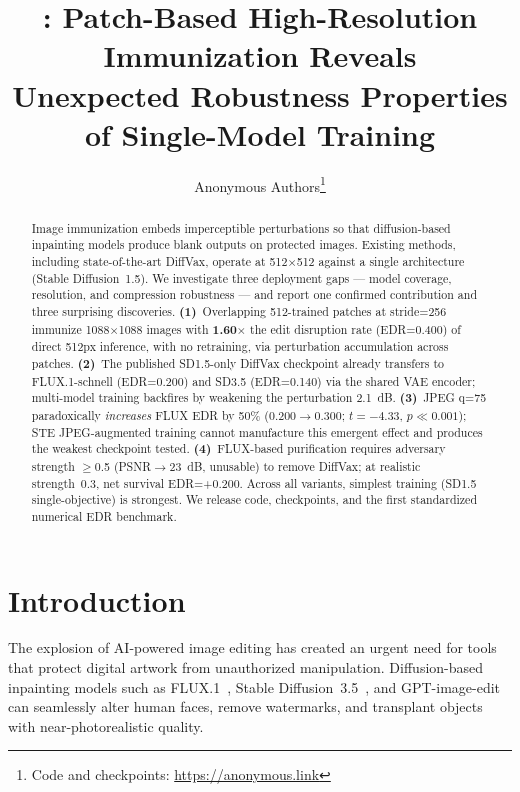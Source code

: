 \documentclass{article}
\title{\diffvaxpp: Patch-Based High-Resolution Immunization Reveals\\
Unexpected Robustness Properties of Single-Model Training}
\author{Anonymous Authors\thanks{Code and checkpoints: \url{https://anonymous.link}}}
\begin{document}
\maketitle

\begin{abstract}
Image immunization embeds imperceptible perturbations so that diffusion-based inpainting
models produce blank outputs on protected images.
Existing methods, including state-of-the-art DiffVax, operate at 512$\times$512 against
a single architecture (Stable Diffusion~1.5).
We investigate three deployment gaps --- model coverage, resolution, and compression
robustness --- and report one confirmed contribution and three surprising discoveries.
\textbf{(1)}~Overlapping 512-trained patches at stride=256 immunize 1088$\times$1088 images
with \textbf{1.60$\times$} the edit disruption rate (EDR=0.400) of direct 512px inference,
with no retraining, via perturbation accumulation across patches.
\textbf{(2)}~The published SD1.5-only DiffVax checkpoint already transfers to
FLUX.1-schnell (EDR=0.200) and SD3.5 (EDR=0.140) via the shared VAE encoder;
multi-model training backfires by weakening the perturbation 2.1~dB.
\textbf{(3)}~JPEG q=75 paradoxically \emph{increases} FLUX EDR by 50\%
(0.200$\to$0.300; $t=-4.33$, $p\ll0.001$); STE JPEG-augmented training
cannot manufacture this emergent effect and produces the weakest checkpoint tested.
\textbf{(4)}~FLUX-based purification requires adversary strength $\geq$0.5 (PSNR$\to$23~dB,
unusable) to remove DiffVax; at realistic strength~0.3, net survival EDR=+0.200.
Across all variants, simplest training (SD1.5 single-objective) is strongest.
We release code, checkpoints, and the first standardized numerical EDR benchmark.
\end{abstract}

\section{Introduction}

The explosion of AI-powered image editing has created an urgent need for tools that
protect digital artwork from unauthorized manipulation. Diffusion-based inpainting
models such as FLUX.1~\citep{flux2024}, Stable Diffusion~3.5~\citep{sd35_2024},
and GPT-image-edit~\citep{openai2024dalle3} can seamlessly alter human faces,
remove watermarks, and transplant objects with near-photorealistic quality.
\end{document}
